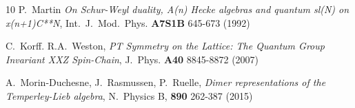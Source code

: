 \documentclass[reqno]{amsart}
\begin{document}
\begin{thebibliography}{10}
     P.~Martin \emph{On Schur-Weyl duality, A(n) Hecke algebras and quantum sl(N) on x(n+1)C**N}, Int.~J.~Mod.~Phys. {\bf{ A7S1B}} 645-673 (1992)
    
     C.~Korff. R.A.~Weston, \emph{PT Symmetry on the Lattice: The Quantum Group Invariant XXZ Spin-Chain}, J.~Phys. {\bf A40} 8845-8872 (2007)
    
     A.~Morin-Duchesne, J.~Rasmussen, P.~Ruelle, \emph{Dimer representations of the Temperley-Lieb algebra}, N.~Physics B, {\bf 890} 262-387 (2015)
\end{thebibliography}
\end{document}
